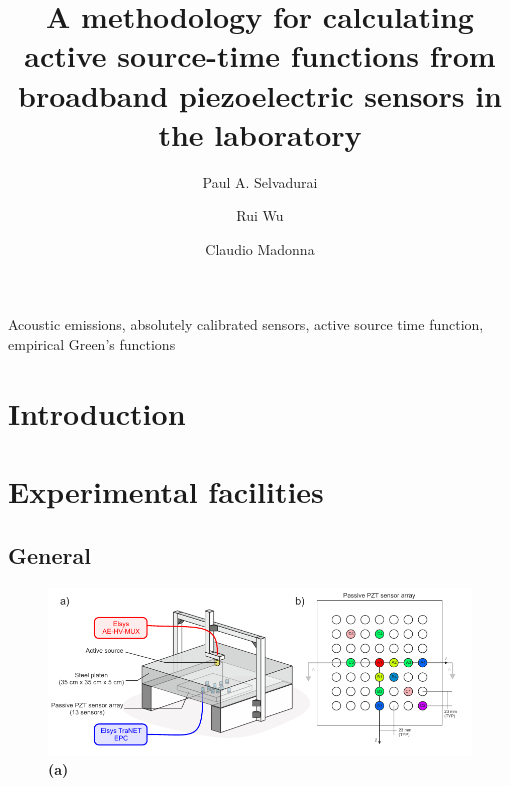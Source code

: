\documentclass[preprint,3p, 11pt,authoryear]{elsarticle}
\begin{document}
\begin{frontmatter}



\title{A methodology for calculating active source-time functions from broadband piezoelectric sensors in the laboratory}

 \author[1]{Paul A. Selvadurai }
\author[2]{Rui Wu}
\author[3]{Claudio Madonna}




\address[1]{Swiss Seismological Service, ETH Zurich, Zurich, Switzerland}
\address[2]{Engineering Geology Group, ETH Zurich, Zurich, Switzerland}
\address[3]{Department of Earth Sciences, ETH Zurich, Zurich, Switzerland}



\begin{abstract}

\end{abstract}

\begin{keyword}
Acoustic emissions, absolutely calibrated sensors, active source time function, empirical Green's functions
\end{keyword}
\end{frontmatter}

\doublespacing
\linenumbers
\clearpage
\section{Introduction}
\label{int}



\section{Experimental facilities}
\subsection{General}

\begin{figure}[ht]
     	\centering
\includegraphics[scale= 1.0]{FIG1.pdf} 
\caption{\textbf{(a)}  }
	\label{fig1} 
\end{figure}
\end{document}
